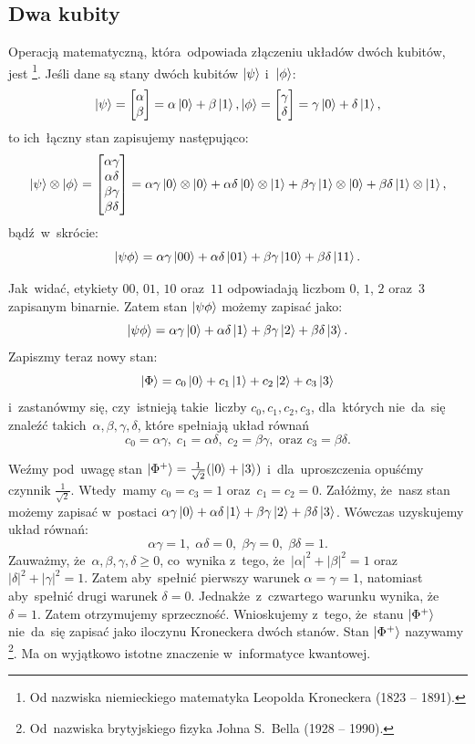 \subsection{Dwa kubity}
Operacją matematyczną, która~odpowiada złączeniu układów dwóch kubitów, jest
\footnote{Od nazwiska niemieckiego matematyka Leopolda Kroneckera (1823 -- 1891).}.
Jeśli dane są stany dwóch kubitów $\ket{\psi}$ i~$\ket{\phi}$:
$$
	\ket{\psi}=
	\begin{bmatrix}
		\alpha \\
		\beta
	\end{bmatrix}
	=\alpha\ket{0}+\beta\ket{1}
	,
	\ket{\phi}=
	\begin{bmatrix}
		\gamma \\
		\delta
	\end{bmatrix}
	= \gamma\ket{0}+ \delta\ket{1},
$$
to ich~łączny stan zapisujemy następująco:
$$
	\ket{\psi}\otimes\ket{\phi}=
	\begin{bmatrix}
		\alpha \gamma \\
		\alpha \delta \\
		\beta \gamma  \\
		\beta \delta
	\end{bmatrix}=
	\alpha \gamma\ket{0}\otimes\ket{0}+
	\alpha \delta\ket{0}\otimes\ket{1}+
	\beta \gamma\ket{1}\otimes\ket{0}+
	\beta \delta\ket{1}\otimes\ket{1},
$$
bądź~w~skrócie:
$$
	\ket{\psi\phi}=
	\alpha \gamma\ket{00}+
	\alpha \delta\ket{01}+
	\beta \gamma\ket{10}+
	\beta \delta\ket{11}.
$$

Jak~widać, etykiety $00$, $01$, $10$ oraz~$11$ odpowiadają liczbom $0$, $1$, $2$
oraz~$3$ zapisanym binarnie.
Zatem stan $\ket{\psi\phi}$ możemy zapisać jako:
$$
	\ket{\psi\phi} =
	\alpha \gamma\ket{0}+
	\alpha \delta\ket{1}+
	\beta \gamma\ket{2}+
	\beta \delta\ket{3}.
$$
Zapiszmy teraz nowy stan:
$$
	\ket{\Phi} = c_0\ket{0} + c_1\ket{1} + c_2\ket{2} + c_3\ket{3}
$$
i~zastanówmy się, czy~istnieją takie~liczby $c_0, c_1, c_2, c_3$,
dla~których nie~da~się znaleźć takich~$\alpha, \beta, \gamma, \delta$,
które spełniają układ równań $$c_0=\alpha \gamma,\; c_1=\alpha \delta,\; c_2=\beta \gamma,
	\text{ oraz } c_3=\beta \delta.$$

Weźmy pod~uwagę stan $\ket{\Phi^+}=\frac{1}{\sqrt{2}}(\ket{0}+\ket{3})$
i~dla~uproszczenia opuśćmy czynnik $\frac{1}{\sqrt{2}}$. Wtedy~mamy
$c_0=c_3=1$ oraz~$c_1=c_2=0$. Załóżmy, że~nasz stan możemy zapisać w~postaci
$\alpha \gamma\ket{0}+ \alpha \delta\ket{1}+\beta
	\gamma\ket{2}+\beta \delta\ket{3}$. Wówczas uzyskujemy układ równań:
$$\alpha \gamma=1,\; \alpha \delta=0,\; \beta\gamma=0,\; \beta\delta=1.$$
Zauważmy, że~$\alpha,
	\beta, \gamma, \delta \geq 0$, co~wynika z~tego, że~$|\alpha|^2+|\beta|^2 = 1$
oraz~$|\delta|^2+|\gamma|^2 = 1$. Zatem aby~spełnić pierwszy warunek $\alpha = \gamma = 1$,
natomiast aby~spełnić drugi warunek $\delta = 0$.
Jednakże~z~czwartego warunku wynika, że~$\delta = 1$. Zatem otrzymujemy
sprzeczność. Wnioskujemy z~tego, że~stanu $\ket{\Phi^+}$ nie~da~się zapisać jako iloczynu
Kroneckera dwóch stanów. Stan $\ket{\Phi^+}$ nazywamy \footnote{Od~nazwiska brytyjskiego fizyka Johna S.~Bella (1928 -- 1990).}. Ma on
wyjątkowo istotne znaczenie w~informatyce kwantowej.

